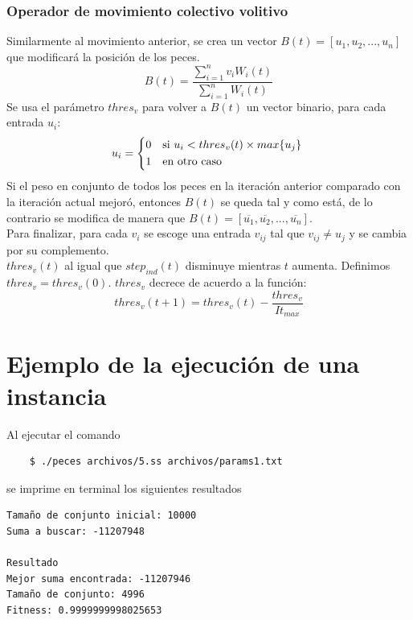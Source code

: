 \documentclass[12pt]{article}
\begin{document}
\subsubsection{Operador de movimiento colectivo volitivo}
Similarmente al movimiento anterior, se crea un vector $B(t) = [u_1, u_2,...,u_n]$ que modificará la posición de los peces.
\begin{equation*}
  B(t) = \frac{\sum_{i=1}^nv_i W_i(t)}{\sum_{i=1}^n W_i(t)}
\end{equation*}
Se usa el parámetro $thres_v$ para volver a $B(t)$ un vector binario, para cada entrada $u_i$:
\begin{equation*}
  u_i =
  \begin{cases*}
    0 & si $u_i < thres_v(t) \times max\{u_j\}$ \\
    1 & en otro caso 
  \end{cases*}
\end{equation*}
Si el peso en conjunto de todos los peces en la iteración anterior comparado con la iteración actual mejoró, entonces $B(t)$ se queda tal y como está, de lo contrario se modifica de manera que $B(t) = [\overline{u_1}, \overline{u_2},...,\overline{u_n}]$. \\

Para finalizar, para cada $v_i$ se escoge una entrada $v_{ij}$ tal que $v_{ij} \neq u_j$ y se cambia por su complemento. \\

$thres_v(t)$ al igual que $step_{ind}(t)$ disminuye mientras $t$ aumenta. Definimos $thres_v = thres_v(0)$. $thres_v$ decrece de acuerdo a la función:
\begin{equation*}
  thres_v(t + 1) = thres_v(t) - \frac{thres_v}{It_{max}}
\end{equation*}

\section{Ejemplo de la ejecución de una instancia}
Al ejecutar el comando
\begin{verbatim}
    $ ./peces archivos/5.ss archivos/params1.txt
\end{verbatim}

se imprime en terminal los siguientes resultados
\begin{verbatim}
Tamaño de conjunto inicial: 10000
Suma a buscar: -11207948

Resultado 
Mejor suma encontrada: -11207946
Tamaño de conjunto: 4996
Fitness: 0.9999999998025653
\end{verbatim}
\end{document}
